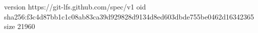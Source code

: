 version https://git-lfs.github.com/spec/v1
oid sha256:f3c4d87bb1c1c08ab83ca39d929828d9134d8ed603dbde755be0462d16342365
size 21960
